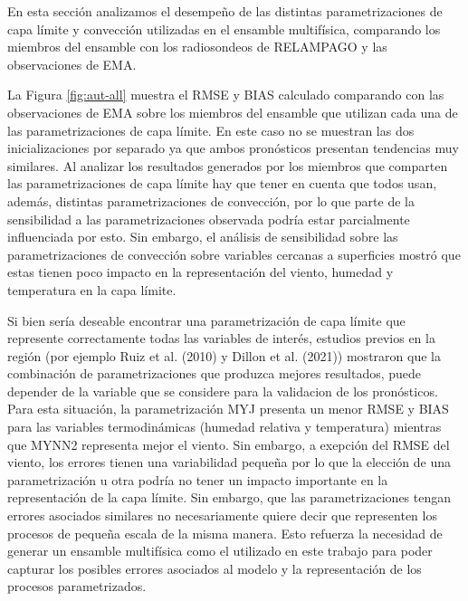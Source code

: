 \documentclass[12pt,oneside,a4paper]{reedthesis}
\begin{document}
En esta sección analizamos el desempeño de las distintas parametrizaciones de capa límite y convección utilizadas en el ensamble multifísica, comparando los miembros del ensamble con los radiosondeos de RELAMPAGO y las observaciones de EMA.

La Figura \ref{fig:aut-all} muestra el RMSE y BIAS calculado comparando con las observaciones de EMA sobre los miembros del ensamble que utilizan cada una de las parametrizaciones de capa límite. En este caso no se muestran las dos inicializaciones por separado ya que ambos pronósticos presentan tendencias muy similares. Al analizar los resultados generados por los miembros que comparten las parametrizaciones de capa límite hay que tener en cuenta que todos usan, además, distintas parametrizaciones de convección, por lo que parte de la sensibilidad a las parametrizaciones observada podría estar parcialmente influenciada por esto. Sin embargo, el análisis de sensibilidad sobre las parametrizaciones de convección sobre variables cercanas a superficies mostró que estas tienen poco impacto en la representación del viento, humedad y temperatura en la capa límite.

Si bien sería deseable encontrar una parametrización de capa límite que represente correctamente todas las variables de interés, estudios previos en la región (por ejemplo Ruiz et al. (2010) y Dillon et al. (2021)) mostraron que la combinación de parametrizaciones que produzca mejores resultados, puede depender de la variable que se considere para la validacion de los pronósticos. Para esta situación, la parametrización MYJ presenta un menor RMSE y BIAS para las variables termodinámicas (humedad relativa y temperatura) mientras que MYNN2 representa mejor el viento. Sin embargo, a exepción del RMSE del viento, los errores tienen una variabilidad pequeña por lo que la elección de una parametrización u otra podría no tener un impacto importante en la representación de la capa límite. Sin embargo, que las parametrizaciones tengan errores asociados similares no necesariamente quiere decir que representen los procesos de pequeña escala de la misma manera. Esto refuerza la necesidad de generar un ensamble multifísica como el utilizado en este trabajo para poder capturar los posibles errores asociados al modelo y la representación de los procesos parametrizados.
\end{document}
